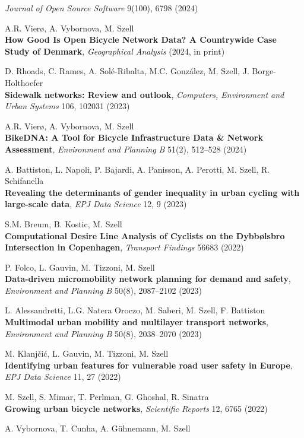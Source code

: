 \documentclass[10pt,a4paper]{article}
\begin{document}
\begin{etaremune}
    \textit{Journal of Open Source Software} 9(100), 6798 (2024)
\item A.R. Vierø, A. Vybornova, M. Szell\\
    \textbf{How Good Is Open Bicycle Network Data? A Countrywide Case Study of Denmark}, \textit{Geographical Analysis} (2024, in print)
\item D. Rhoads, C. Rames, A. Solé-Ribalta, M.C. González, M. Szell, J. Borge-Holthoefer\\
    \textbf{Sidewalk networks: Review and outlook},
    \textit{Computers, Environment and Urban Systems} 106, 102031 (2023)
\item A.R. Vierø, A. Vybornova, M. Szell\\
    \textbf{BikeDNA: A Tool for Bicycle Infrastructure Data \& Network Assessment},
    \textit{Environment and Planning B} 51(2), 512--528 (2024)
\item A. Battiston, L. Napoli, P. Bajardi, A. Panisson, A. Perotti, M. Szell, R. Schifanella\\
    \textbf{Revealing the determinants of gender inequality in urban cycling with large-scale data}, 
    \textit{EPJ Data Science} 12, 9 (2023)
\item S.M. Breum, B. Kostic, M. Szell\\
    \textbf{Computational Desire Line Analysis of Cyclists on the Dybbølsbro Intersection in Copenhagen}, \textit{Transport Findings} 56683 (2022)
\item P. Folco, L. Gauvin, M. Tizzoni, M. Szell\\
    \textbf{Data-driven micromobility network planning for demand and safety}, \textit{Environment and Planning B} 50(8), 2087--2102 (2023)
\item L. Alessandretti, L.G. Natera Oroczo, M. Saberi, M. Szell, F. Battiston\\
    \textbf{Multimodal urban mobility and multilayer transport networks}, \textit{Environment and Planning B} 50(8), 2038--2070 (2023)
\item M. Klanjčić, L. Gauvin, M. Tizzoni, M. Szell\\
    \textbf{Identifying urban features for vulnerable road user safety in Europe}, \textit{EPJ Data Science} 11, 27 (2022)
\item M. Szell, S. Mimar, T. Perlman, G. Ghoshal, R. Sinatra\\
    \textbf{Growing urban bicycle networks}, \textit{Scientific Reports} 12, 6765 (2022)
\item A. Vybornova, T. Cunha, A. Gühnemann, M. Szell\\

\end{etaremune}
\end{document}
